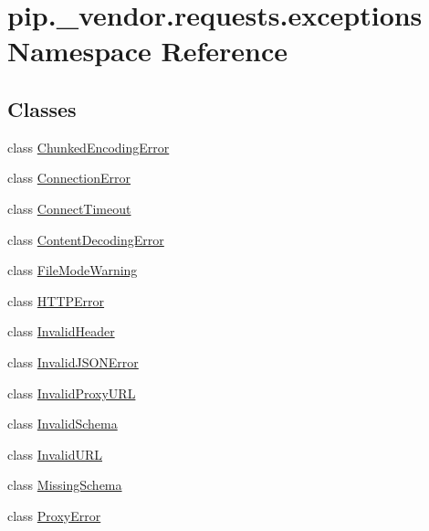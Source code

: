 \hypertarget{namespacepip_1_1__vendor_1_1requests_1_1exceptions}{}\section{pip.\+\_\+vendor.\+requests.\+exceptions Namespace Reference}
\label{namespacepip_1_1__vendor_1_1requests_1_1exceptions}
\subsection*{Classes}
\begin{DoxyCompactItemize}
\item 
class \hyperlink{classpip_1_1__vendor_1_1requests_1_1exceptions_1_1ChunkedEncodingError}{Chunked\+Encoding\+Error}
\item 
class \hyperlink{classpip_1_1__vendor_1_1requests_1_1exceptions_1_1ConnectionError}{Connection\+Error}
\item 
class \hyperlink{classpip_1_1__vendor_1_1requests_1_1exceptions_1_1ConnectTimeout}{Connect\+Timeout}
\item 
class \hyperlink{classpip_1_1__vendor_1_1requests_1_1exceptions_1_1ContentDecodingError}{Content\+Decoding\+Error}
\item 
class \hyperlink{classpip_1_1__vendor_1_1requests_1_1exceptions_1_1FileModeWarning}{File\+Mode\+Warning}
\item 
class \hyperlink{classpip_1_1__vendor_1_1requests_1_1exceptions_1_1HTTPError}{H\+T\+T\+P\+Error}
\item 
class \hyperlink{classpip_1_1__vendor_1_1requests_1_1exceptions_1_1InvalidHeader}{Invalid\+Header}
\item 
class \hyperlink{classpip_1_1__vendor_1_1requests_1_1exceptions_1_1InvalidJSONError}{Invalid\+J\+S\+O\+N\+Error}
\item 
class \hyperlink{classpip_1_1__vendor_1_1requests_1_1exceptions_1_1InvalidProxyURL}{Invalid\+Proxy\+U\+RL}
\item 
class \hyperlink{classpip_1_1__vendor_1_1requests_1_1exceptions_1_1InvalidSchema}{Invalid\+Schema}
\item 
class \hyperlink{classpip_1_1__vendor_1_1requests_1_1exceptions_1_1InvalidURL}{Invalid\+U\+RL}
\item 
class \hyperlink{classpip_1_1__vendor_1_1requests_1_1exceptions_1_1MissingSchema}{Missing\+Schema}
\item 
class \hyperlink{classpip_1_1__vendor_1_1requests_1_1exceptions_1_1ProxyError}{Proxy\+Error}

\end{DoxyCompactItemize}
